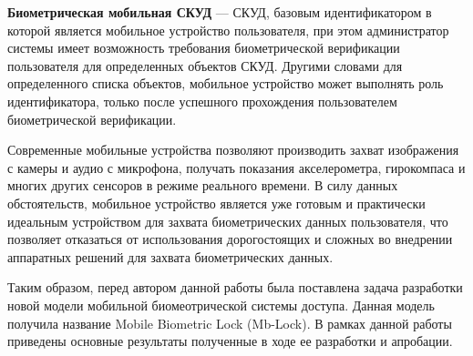 \medskip

\textbf{Биометрическая мобильная СКУД} — СКУД, базовым идентификатором в которой является мобильное устройство пользователя, при этом администратор системы имеет возможность требования биометрической верификации пользователя для определенных объектов СКУД. Другими словами для определенного списка объектов, мобильное устройство может выполнять роль идентификатора, только после успешного прохождения пользователем биометрической верификации.

Современные мобильные устройства позволяют производить захват изображения с камеры и аудио с микрофона, получать показания акселерометра, гирокомпаса и многих других сенсоров в режиме реального времени. В силу данных обстоятельств, мобильное устройство является уже готовым и практически идеальным устройством для захвата биометрических данных пользователя, что позволяет отказаться от использования дорогостоящих и сложных во внедрении аппаратных решений для захвата биометрических данных.

Таким образом, перед автором данной работы была поставлена задача разработки новой модели мобильной биомеотрической системы доступа. Данная модель получила название Mobile Biometric Lock (Mb-Lock). В рамках данной работы приведены основные результаты полученные в ходе ее разработки и апробации.

\clearpage